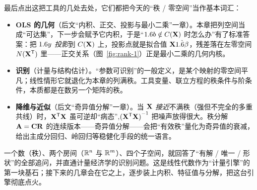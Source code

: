 最后点出这把工具的几处去处，它们都把今天的``秩 / 零空间''当作基本词汇：
\begin{itemize}
    \item \textbf{OLS 的几何}（后文``内积、正交、投影与最小二乘''一章）。本章把列空间当成``可达集''，下一步会赋予它内积，于是``$1.6 b\notin C(\mathbf{X})$ 时怎么办''有了标准答案：把 $1.6 y$ \emph{投影}到 $C(\mathbf{X})$ 上，投影点就是拟合值 $\mathbf{X}\hat{1.6\beta}$，残差落在左零空间 $N(\mathbf{X}^{\mathsf{T}})$ 里——正交关系（图~\ref{fig:rank-1}）正是最小二乘的几何内核。
    \item \textbf{识别}（计量与结构估计）。``参数可识别''的一般定义，是某个映射的零空间平凡；线性情形它就退化为本章的列满秩。工具变量、联立方程的秩条件与阶条件，本质都是在数另一个矩阵的秩。
    \item \textbf{降维与近似}（后文``奇异值分解''一章）。当 $\mathbf{X}$ \emph{接近}不满秩（强但不完全的多重共线）时，$\mathbf{X}^{\mathsf{T}}\mathbf{X}$ 虽可逆却``病态'',${(\mathbf{X}^{\mathsf{T}}\mathbf{X})}^{-1}$ 把噪声放得很大。秩分解 $\mathbf{A}=\mathbf{C}\mathbf{R}$ 的连续版本——奇异值分解——会把``有效秩''量化为奇异值的衰减，给出主成分回归、岭回归等稳健化手段的统一语言。
\end{itemize}

一个数（秩）、两个房间（$\mathbb{R}^n$ 与 $\mathbb{R}^m$）、四个子空间，就回答了``有解 / 唯一 / 形状''的全部追问，并直通计量经济学的识别问题。这是线性代数作为``计量引擎''的第一块基石；接下来的几章会在它之上，逐步装上内积、特征值与分解，把这台引擎彻底点火。
